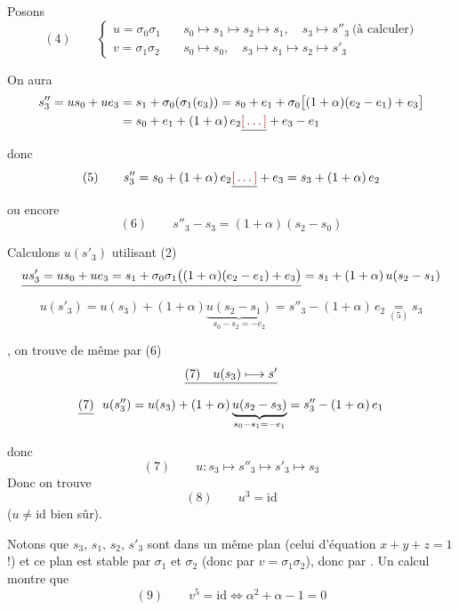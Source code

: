 \documentclass[11pt,a4paper]{article}
\begin{document}
Posons
\[ (4) \qquad \begin{cases} u = \sigma_0\sigma_1 & \quad s_0 \mapsto s_1 \mapsto s_2 \mapsto s_1,\quad s_3 \mapsto s''_3 \ \text{(à calculer)} \\ v = \sigma_1\sigma_2 & \quad s_0 \mapsto s_0,\quad s_3 \mapsto s_1 \mapsto s_2 \mapsto s'_3 \end{cases} \]


On aura
\begin{align*}
s''_3 = u s_0 + u e_3 &= s_1 + \sigma_0(\sigma_1(e_3)) = s_0 + e_1 + \sigma_0\bigl[(1+\alpha)(e_2 - e_1) + e_3\bigr] \\
&= s_0 + e_1 + (1+\alpha)\, e_2 \struck{\ill{}} + e_3 - e_1
\end{align*}
donc
\[ (5) \qquad s''_3 = s_0 + (1+\alpha)\, e_2 \struck{\ill{}} + e_3 = s_3 + (1+\alpha)\, e_2 \]
ou encore
\[ (6) \qquad s''_3 - s_3 = (1+\alpha)(s_2 - s_0) \]

Calculons $u(s'_3)$ utilisant (2)
\[ \struck{u s'_3 = u s_0 + u e_3 = s_1 + \sigma_0\sigma_1\bigl((1+\alpha)(e_2 - e_1) + e_3\bigr)} = s_1 + (1+\alpha)\, u(s_2 - s_1) \]
\[ u(s'_3) = u(s_3) + (1+\alpha)\underbrace{u(s_2 - s_1)}_{s_0 - s_2 = -e_2} = s''_3 - (1+\alpha)\, e_2 \underset{(5)}{=} s_3 \]

\struck{\ill{}} , on trouve de même par (6)
\[ \struck{(7) \quad u(s_3) \longmapsto s'} \]
\[ \struck{(7)}\ \ u(s''_3) = u(s_3) + (1+\alpha)\underbrace{u(s_2 - s_3)}_{s_0 - s_1 = -e_1} = s''_3 - (1+\alpha)\, e_1 \]

donc
\[ (7) \qquad u : s_3 \longmapsto s''_3 \longmapsto s'_3 \longmapsto s_3 \]
Donc on trouve
\[ (8) \qquad u^3 = \mathrm{id} \]
\struck{\ill{}} ($u \neq \mathrm{id}$ bien sûr).

Notons que $s_3$, $s_1$, $s_2$, $s'_3$ sont dans un même plan (celui d'équation $x + y + z = 1$ !) et ce plan est stable par $\sigma_1$ et $\sigma_2$ (donc par $v = \sigma_1\sigma_2$),  donc par . Un calcul  montre que
\[ (9) \qquad v^5 = \mathrm{id} \iff \boxed{\alpha^2 + \alpha - 1 = 0} \]
\end{document}

